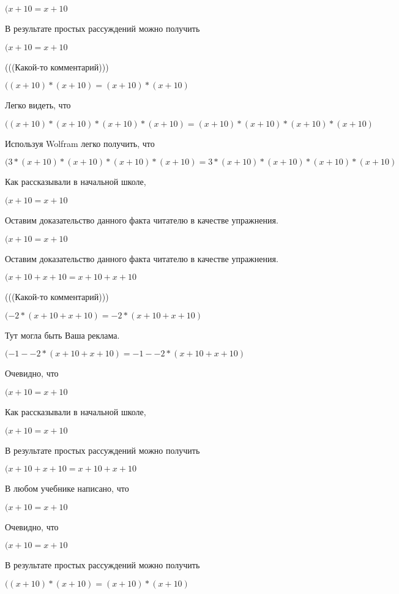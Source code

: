 \documentclass[12pt,a4paper,fleqn]{article}
\theoremstyle{definition}
\begin{document}
$( x  +  10  =  x  +  10 $

В результате простых рассуждений можно получить

$( x  +  10  =  x  +  10 $

(((Какой-то комментарий)))

$(( x  +  10 ) * ( x  +  10 ) = ( x  +  10 ) * ( x  +  10 )$

Легко видеть, что

$(( x  +  10 ) * ( x  +  10 ) * ( x  +  10 ) * ( x  +  10 ) = ( x  +  10 ) * ( x  +  10 ) * ( x  +  10 ) * ( x  +  10 )$

Используя Wolfram легко получить, что

$( 3  * ( x  +  10 ) * ( x  +  10 ) * ( x  +  10 ) * ( x  +  10 ) =  3  * ( x  +  10 ) * ( x  +  10 ) * ( x  +  10 ) * ( x  +  10 )$

Как рассказывали в начальной школе,

$( x  +  10  =  x  +  10 $

Оставим доказательство данного факта читателю в качестве упражнения.

$( x  +  10  =  x  +  10 $

Оставим доказательство данного факта читателю в качестве упражнения.

$( x  +  10  +  x  +  10  =  x  +  10  +  x  +  10 $

(((Какой-то комментарий)))

$( -2  * ( x  +  10  +  x  +  10 ) =  -2  * ( x  +  10  +  x  +  10 )$

Тут могла быть Ваша реклама.

$( -1  -  -2  * ( x  +  10  +  x  +  10 ) =  -1  -  -2  * ( x  +  10  +  x  +  10 )$

Очевидно, что

$( x  +  10  =  x  +  10 $

Как рассказывали в начальной школе,

$( x  +  10  =  x  +  10 $

В результате простых рассуждений можно получить

$( x  +  10  +  x  +  10  =  x  +  10  +  x  +  10 $

В любом учебнике написано, что

$( x  +  10  =  x  +  10 $

Очевидно, что

$( x  +  10  =  x  +  10 $

В результате простых рассуждений можно получить

$(( x  +  10 ) * ( x  +  10 ) = ( x  +  10 ) * ( x  +  10 )$
\end{document}

